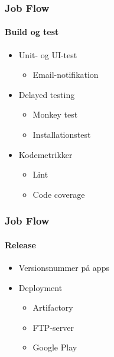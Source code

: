 \begin{frame}
    \frametitle{Job Flow}
    \framesubtitle{Build og test}
\begin{itemize}
  \item Unit- og UI-test
    \begin{itemize}
    \item Email-notifikation
    \end{itemize}
  \item Delayed testing
    \begin{itemize}
    \item Monkey test
    \item Installationstest
    \end{itemize}
  \item Kodemetrikker
    \begin{itemize}
    \item Lint
    \item Code coverage
    \end{itemize}
  \end{itemize}
\end{frame}

\begin{frame}
    \frametitle{Job Flow}
    \framesubtitle{Release}
    \begin{itemize}
    \item Versionsnummer på apps
    \item Deployment
      \begin{itemize}
      \item Artifactory
      \item FTP-server
      \item Google Play
      \end{itemize}
    \end{itemize}
  \end{frame}
